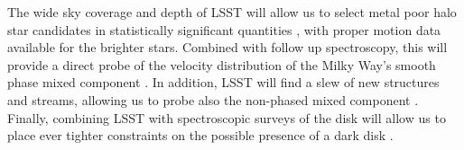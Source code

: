 The wide sky coverage and depth of LSST will allow us to select metal poor halo star candidates in statistically significant quantities \citep[\eg,][]{2017MNRAS.471.2587S}, with proper motion data available for the brighter stars. Combined with follow up spectroscopy, this will provide a direct probe of the velocity distribution of the Milky Way's smooth phase mixed component \citep{2018PhRvL.120d1102H}. In addition, LSST will find a slew of new structures and streams, allowing us to probe also the non-phased mixed component \citep{2005PhRvD..71d3516F,2018arXiv181011468E}. Finally, combining LSST with spectroscopic surveys of the disk will allow us to place ever tighter constraints on the possible presence of a dark disk \citep{2015MNRAS.450.2874R}.

\begin{comment}

The signal strength of dark matter (DM) scattering in direct detection experiments depends on both the local DM density and the DM velocity distribution. In this section we focus on the DM velocity distribution.

The differential rate with respect to the recoil energy $dR/dQ$ depends on the integral of the DM velocity distribution, $f(v)$, as
\begin{equation}
    \frac{dR}{dQ} \propto \int_{v_{\rm{min}}}^{v_{\rm{esc}}} \frac{f(v)}{v} dv, 
\end{equation}
where $v_{\rm{min}} = \sqrt{Q m_N/ (2 \mu^2)}$, with $Q$ the recoil energy, $m_N$ the mass of the nucleus against which DM is scattering, and $\mu = (m_N m_\chi / (m_N + m_\chi))$ the reduced mass of the nucleus $m_N$ and the DM mass $m_\chi$.

A novel method has recently been proposed to use the stars as tracers for the DM velocity \citep{Herzog-Arbeitman:2017fte,Necib:2018b}. These papers suggest that since accreted DM and stars have a comment origin, and are both collisionless, accreted stars are able to trace the velocity distribution of DM. This correlation holds for both the relaxed component of the DM, traced by older metal poor stars, and DM velocity substructure called debris flow traced by less metal poor stars from more recent mergers \citep{Lisanti:2011as,Kuhlen:2012fz,Lisanti:2014dva}. 

This method has already been applied on RAVE-TGAS data \citep{Herzog-Arbeitman:2017zbm}, and the second data release of Gaia in \cite{necib2018}. It has been found that the relaxed component of the DM although isotropic, has a mean speed lower than that of the assumed Maxwell Boltzmann distribution, reducing current limits by direct detection experiments \citep{Aprile:2018dbl}.


\end{comment}
